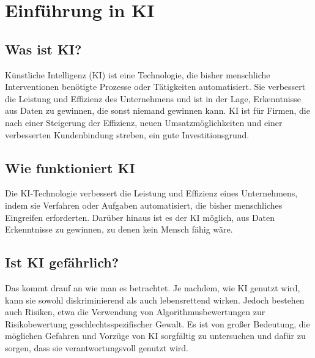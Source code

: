 \section{Einführung in KI}

\subsection{Was ist KI?}
Künstliche Intelligenz (KI) ist eine Technologie, die bisher menschliche 
Interventionen benötigte Prozesse oder Tätigkeiten automatisiert. 
Sie verbessert die Leistung und Effizienz des Unternehmens und ist in der Lage, 
Erkenntnisse aus Daten zu gewinnen, die sonst niemand gewinnen kann.
KI ist für Firmen, die nach einer Steigerung der Effizienz, 
neuen Umsatzmöglichkeiten und einer verbesserten Kundenbindung streben,
ein gute Investitionsgrund.

\subsection{Wie funktioniert KI}
Die KI-Technologie verbessert die Leistung und Effizienz eines Unternehmens,
indem sie Verfahren oder Aufgaben automatisiert, die bisher menschliches Eingreifen
erforderten. Darüber hinaus ist es der KI möglich, aus Daten Erkenntnisse zu gewinnen,
zu denen kein Mensch fähig wäre.


\subsection{Ist KI gefährlich?}
Das kommt drauf an wie man es betrachtet. Je nachdem, wie KI genutzt wird,
kann sie sowohl diskriminierend als auch lebensrettend wirken. 
Jedoch bestehen auch Risiken, etwa die Verwendung von Algorithmusbewertungen 
zur Risikobewertung geschlechtsspezifischer Gewalt. Es ist von großer 
Bedeutung, die möglichen Gefahren und Vorzüge von KI sorgfältig zu untersuchen 
und dafür zu sorgen, dass sie verantwortungsvoll genutzt wird.

